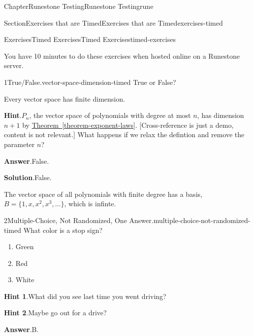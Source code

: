 \documentclass[oneside,10pt,]{book}
\newcommand{\blocktitlefont}{\relax}
\newcommand{\xreffont}{\relax}
\numberwithin{equation}{section}
\begin{document}
\begin{chapterptx}{Chapter}{Runestone Testing}{}{Runestone Testing}{}{}{rune}
\begin{sectionptx}{Section}{Exercises that are Timed}{}{Exercises that are Timed}{}{}{exercises-timed}
\begin{exercises-subsection-numberless}{Exercises}{Timed Exercises}{}{Timed Exercises}{}{}{timed-exercises}
\begin{introduction}{}%
You have 10 minutes to do these exercises when hosted online on a Runestone server.%
\end{introduction}%
\begin{divisionexercise}{1}{True\slash{}False.}{}{vector-space-dimension-timed}%
%
True or False?%
\par
Every vector space has finite dimension.%
\par\smallskip%
\noindent\textbf{\blocktitlefont Hint}.\hypertarget{vector-space-dimension-timed-4}{}\quad{}\(P_n\), the vector space of polynomials with degree at most \(n\), has dimension \(n+1\) by \hyperref[theorem-exponent-laws]{Theorem~{\xreffont\ref{theorem-exponent-laws}}}.  [Cross-reference is just a demo, content is not relevant.]  What happens if we relax the defintion and remove the parameter \(n\)?%
\par\smallskip%
\noindent\textbf{\blocktitlefont Answer}.\hypertarget{vector-space-dimension-timed-5}{}\quad{}False.%
\par\smallskip%
\noindent\textbf{\blocktitlefont Solution}.\hypertarget{vector-space-dimension-timed-6}{}\quad{}False.%
\par
The vector space of all polynomials with finite degree has a basis, \(B = \{1,x,x^2,x^3,\dots\}\), which is infinte.%
\end{divisionexercise}%
\begin{divisionexercise}{2}{Multiple-Choice, Not Randomized, One Answer.}{}{multiple-choice-not-randomized-timed}%
%
What color is a stop sign?%
\par
%
\begin{enumerate}[label={\Alph*.}]
\item{}Green%
\item{}Red%
\item{}White%
\end{enumerate}
%
\par\smallskip%
\noindent\textbf{\blocktitlefont Hint 1}.\hypertarget{multiple-choice-not-randomized-timed-4}{}\quad{}What did you see last time you went driving?%
\par\smallskip%
\noindent\textbf{\blocktitlefont Hint 2}.\hypertarget{multiple-choice-not-randomized-timed-5}{}\quad{}Maybe go out for a drive?%
\par\smallskip%
\noindent\textbf{\blocktitlefont Answer}.\hypertarget{multiple-choice-not-randomized-timed-6}{}\quad{}B.%
\par\smallskip%

\end{divisionexercise}
\end{exercises-subsection-numberless}
\end{sectionptx}
\end{chapterptx}
\end{document}
